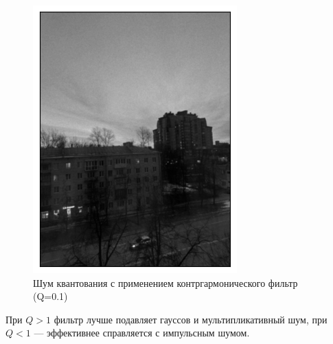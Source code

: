 \documentclass[a4paper,12pt]{article}
\begin{document}
\begin{figure}[H]
\begin{minipage}{0.49\textwidth}
        \centering \includegraphics[width=\textwidth]{results/lpf_pois_4.png}
        \caption{Шум квантования с применением контргармонического фильтр (Q=0.1)}
    \end{minipage}
\end{figure}
\noindent
При \(Q>1\) фильтр лучше подавляет гауссов и мультипликативный шум, при \(Q<1\) --- эффективнее справляется с импульсным шумом.
\end{document}
